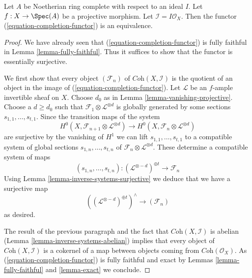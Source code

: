 \begin{lemma}
\label{lemma-existence-projective}
Let $A$ be Noetherian ring complete with respect to an ideal $I$.
Let $f : X \to \Spec(A)$ be a projective morphism. Let
$\mathcal{I} = I\mathcal{O}_X$.
Then the functor (\ref{equation-completion-functor}) is an equivalence.
\end{lemma}

\begin{proof}
We have already seen that (\ref{equation-completion-functor}) is
fully faithful in Lemma \ref{lemma-fully-faithful}. Thus it suffices
to show that the functor is essentially surjective.

\medskip\noindent
We first show that every object $(\mathcal{F}_n)$ of
$\textit{Coh}(X, \mathcal{I})$ is the quotient of an object
in the image of (\ref{equation-completion-functor}). 
Let $\mathcal{L}$ be an $f$-ample invertible sheaf on $X$.
Choose $d_0$ as in Lemma \ref{lemma-vanishing-projective}.
Choose a $d \geq d_0$ such that
$\mathcal{F}_1 \otimes \mathcal{L}^{\otimes d}$
is globally generated by some sections $s_{1, 1}, \ldots, s_{t, 1}$.
Since the transition maps of the system
$$
H^0(X, \mathcal{F}_{n + 1} \otimes \mathcal{L}^{\otimes d})
\longrightarrow
H^0(X, \mathcal{F}_n \otimes \mathcal{L}^{\otimes d})
$$
are surjective by the vanishing of $H^1$ we can lift
$s_{1, 1}, \ldots, s_{t, 1}$ to a compatible system of global sections
$s_{1, n}, \ldots, s_{t, n}$ of
$\mathcal{F}_n \otimes \mathcal{L}^{\otimes d}$.
These determine a compatible system of maps
$$
(s_{1, n}, \ldots, s_{t, n}) :
(\mathcal{L}^{\otimes -d})^{\oplus t} \longrightarrow \mathcal{F}_n
$$
Using Lemma \ref{lemma-inverse-systems-surjective}
we deduce that we have a surjective map
$$
\left((\mathcal{L}^{\otimes -d})^{\oplus t}\right)^\wedge
\longrightarrow
(\mathcal{F}_n)
$$
as desired.

\medskip\noindent
The result of the previous paragraph and the fact that
$\textit{Coh}(X, \mathcal{I})$ is abelian
(Lemma \ref{lemma-inverse-systems-abelian})
implies that
every object of $\textit{Coh}(X, \mathcal{I})$ is a cokernel
of a map between objects coming from $\textit{Coh}(\mathcal{O}_X)$.
As (\ref{equation-completion-functor}) is fully faithful and exact by
Lemmas \ref{lemma-fully-faithful} and \ref{lemma-exact}
we conclude.
\end{proof}